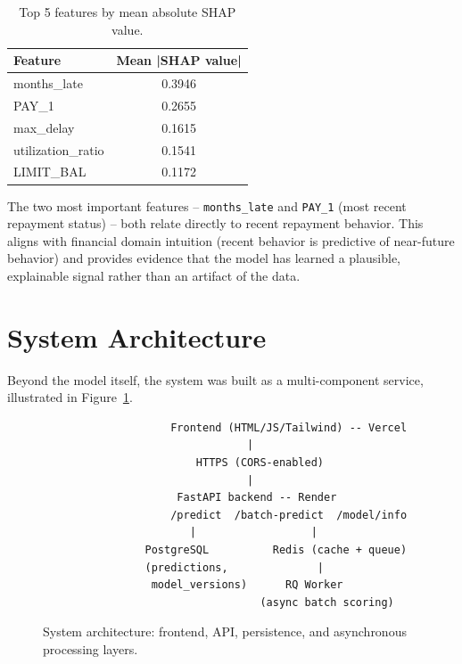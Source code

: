 \documentclass[11pt]{article}
\begin{document}
\begin{table}[H]
\centering
\caption{Top 5 features by mean absolute SHAP value.}
\label{tab:shap}
\begin{tabular}{lc}
\toprule
\textbf{Feature} & \textbf{Mean |SHAP value|} \\
\midrule
months\_late       & 0.3946 \\
PAY\_1             & 0.2655 \\
max\_delay         & 0.1615 \\
utilization\_ratio & 0.1541 \\
LIMIT\_BAL         & 0.1172 \\
\bottomrule
\end{tabular}
\end{table}

The two most important features -- \texttt{months\_late} and
\texttt{PAY\_1} (most recent repayment status) -- both relate directly to
recent repayment behavior. This aligns with financial domain intuition
(recent behavior is predictive of near-future behavior) and provides
evidence that the model has learned a plausible, explainable signal
rather than an artifact of the data.

\section{System Architecture}

Beyond the model itself, the system was built as a multi-component
service, illustrated in Figure~\ref{fig:architecture}.

\begin{figure}[H]
\centering
\begin{verbatim}
                    Frontend (HTML/JS/Tailwind) -- Vercel
                                |
                        HTTPS (CORS-enabled)
                                |
                     FastAPI backend -- Render
                    /predict  /batch-predict  /model/info
                       |                  |
                PostgreSQL          Redis (cache + queue)
                (predictions,              |
                 model_versions)      RQ Worker
                                  (async batch scoring)
\end{verbatim}
\caption{System architecture: frontend, API, persistence, and
asynchronous processing layers.}
\label{fig:architecture}
\end{figure}
\end{document}
